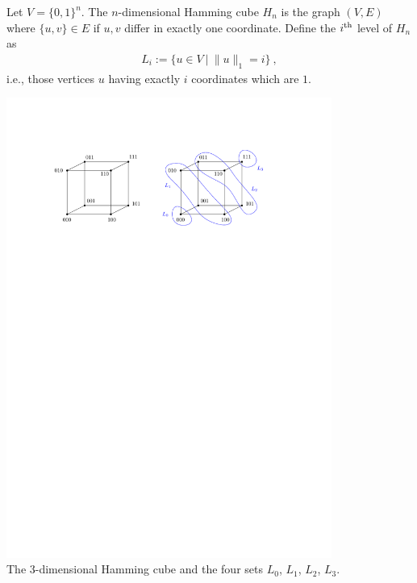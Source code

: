 \documentclass[12pt,a4]{article}
\newcommand{\norm}[1]{\|#1\|}
\newcommand{\nth}[1]{#1\textsuperscript{th}}
\begin{document}
Let $V = \{0,1\}^n$. The $n$-dimensional Hamming cube $H_n$ is the graph $(V,E)$ where
$\{u,v\} \in E$ if $u,v$ differ in exactly one coordinate.
Define the $\nth{i}$ level of $H_n$ as 
\begin{align*}
  L_i := \{u \in V \ | \ \norm{u}_1 = i \} \ ,
\end{align*}
i.e., those vertices $u$ having exactly $i$ coordinates which are $1$.
\begin{center}
  \includegraphics[width=0.8\textwidth]{hamming-3-dim.pdf}\\
  {\small The $3$-dimensional Hamming cube and the four 
    sets $L_0$, $L_1$, $L_2$, $L_3$.}
\end{center}
\end{document}
